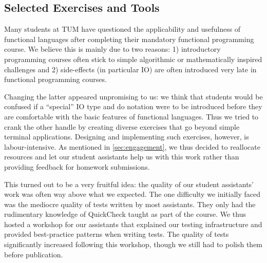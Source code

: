\subsection{Selected Exercises and Tools}\label{sec:selected_exercises}

Many students at TUM have questioned the
applicability and usefulness
of functional languages after completing
their mandatory functional programming course.
We believe this is mainly due to two reasons:
1) introductory programming courses often stick
to simple algorithmic or mathematically inspired challenges and
2) side-effects (in particular IO)
are often introduced very late
in functional programming courses.

Changing the latter appeared unpromising to us:
we think that students would be confused
if a ``special'' IO type and do notation were to
be introduced before they are comfortable
with the basic features of functional
languages.
Thus we tried to crank the other handle
by creating diverse exercises that go beyond
simple terminal applications.
Designing and implementing such exercises,
however, is labour-intensive.
As mentioned in \cref{sec:engagement},
we thus decided to reallocate resources and
let our student assistants help us with this work
rather than providing feedback for homework submissions.

This turned out to be a very fruitful idea:
the quality of our student assistants' work was often way above what
we expected.
The one difficulty we initially faced was the mediocre quality of
tests written by most assistants.
They only had the rudimentary knowledge of QuickCheck taught as part of
the course.
We thus hosted a workshop for our assistants that explained
our testing infrastructure and provided best-practice
patterns when writing tests.
The quality of tests significantly increased following this workshop,
though we still had to polish them before publication.

